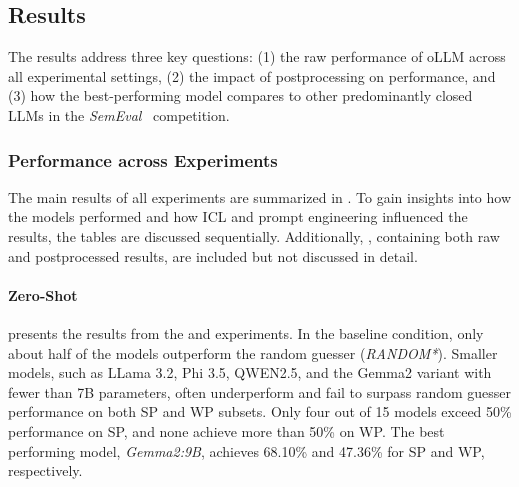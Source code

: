 \subsection{Results}

The results address three key questions: (1) the raw performance of \ac{oLLM} across all experimental settings, (2) the impact of postprocessing on performance, and (3) how the best-performing model compares to other predominantly closed \acp{LLM} in the \textit{SemEval}~\cite{jiangSemEval2024Task92024} competition.


\subsubsection{Performance across Experiments}
\label{sec:performance-across-experiments}

The main results of all experiments are summarized in . To gain insights into how the models performed and how \ac{ICL} and prompt engineering influenced the results, the tables are discussed sequentially. Additionally, , containing both raw and postprocessed results, are included but not discussed in detail.

\paragraph{Zero-Shot}

 presents the results from the  and  experiments. In the baseline condition, only about half of the models outperform the random guesser (\textit{RANDOM*}). Smaller models, such as LLama 3.2, Phi 3.5, QWEN2.5, and the Gemma2 variant with fewer than 7B parameters, often underperform and fail to surpass random guesser performance on both \ac{SP} and \ac{WP} subsets. Only four out of 15 models exceed 50\% performance on \ac{SP}, and none achieve more than 50\% on \ac{WP}. The best performing model, \textit{Gemma2:9B}, achieves 68.10\% and 47.36\% for \ac{SP} and \ac{WP}, respectively.

